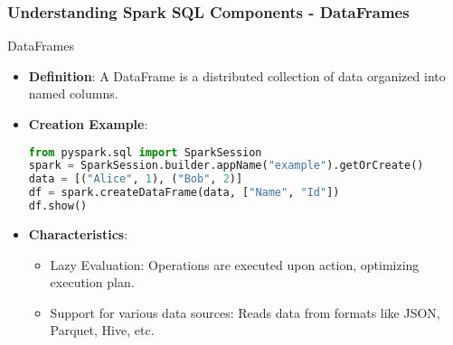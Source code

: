 \documentclass[aspectratio=169]{beamer}
\begin{document}
\begin{frame}[fragile]
    \frametitle{Understanding Spark SQL Components - DataFrames}
    \begin{block}{DataFrames}
        \begin{itemize}
            \item \textbf{Definition}: A DataFrame is a distributed collection of data organized into named columns.
            \item \textbf{Creation Example}:
            \begin{lstlisting}[language=Python]
from pyspark.sql import SparkSession
spark = SparkSession.builder.appName("example").getOrCreate()
data = [("Alice", 1), ("Bob", 2)]
df = spark.createDataFrame(data, ["Name", "Id"])
df.show()
            \end{lstlisting}
            \item \textbf{Characteristics}:
            \begin{itemize}
                \item Lazy Evaluation: Operations are executed upon action, optimizing execution plan.
                \item Support for various data sources: Reads data from formats like JSON, Parquet, Hive, etc.
            \end{itemize}
        \end{itemize}
    \end{block}
\end{frame}
\end{document}
